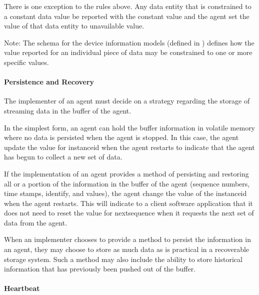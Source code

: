 \documentclass{mtconnect}	%
\begin{document}
There is one exception to the rules above.  Any \gls{data entity} that is constrained to a constant data value \MUST be reported with the constant value and the \gls{agent} \MUSTNOT set the value of that \gls{data entity} to \gls{unavailable value}.

\begin{note}
Note:	The schema for the \glspl{device information model} (defined in ) defines how the value reported for an individual piece of data may be constrained to one or more specific values.

\end{note}

\paragraph{Persistence and Recovery}\mbox{}

The implementer of an \gls{agent} must decide on a strategy regarding the storage of \gls{streaming data} in the \gls{buffer} of the \gls{agent}.

In the simplest form, an \gls{agent} can hold the \gls{buffer} information in volatile memory where no data is persisted when the \gls{agent} is stopped.  In this case, the \gls{agent} \MUST update the value for \gls{instanceid} when the \gls{agent} restarts to indicate that the \gls{agent} has begun to collect a new set of data.

If the implementation of an \gls{agent} provides a method of persisting and restoring all or a portion of the information in the \gls{buffer} of the \gls{agent} (\glspl{sequence number}, \glspl{time stamp}, identify, and values), the \gls{agent} \MUSTNOT change the value of the \gls{instanceid} when the \gls{agent} restarts.  This will indicate to a client software application that it does not need to reset the value for \gls{nextsequence} when it requests the next set of data from the \gls{agent}.

When an implementer chooses to provide a method to persist the information in an \gls{agent}, they may choose to store as much data as is practical in a recoverable storage system.  Such a method may also include the ability to store historical information that has previously been pushed out of the \gls{buffer}.

\paragraph{Heartbeat}\mbox{}
\end{document}
